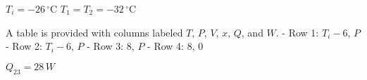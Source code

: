 \( T_i = -26 \, ^\circ \text{C} \)  
\( T_1 = T_2 = -32 \, ^\circ \text{C} \)  

A table is provided with columns labeled \( T \), \( P \), \( V \), \( x \), \( Q \), and \( W \).  
- Row 1: \( T_i - 6 \), \( P \)  
- Row 2: \( T_i - 6 \), \( P \)  
- Row 3: \( 8 \), \( P \)  
- Row 4: \( 8 \), \( 0 \)  

\( Q_{23} = 28 \, W \)